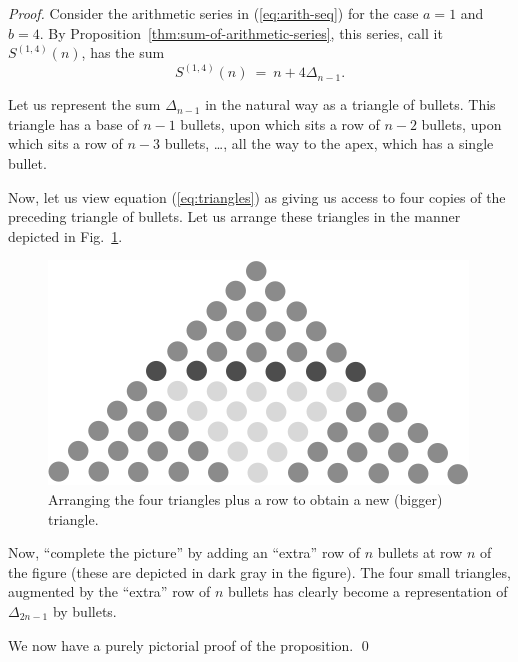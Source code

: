 \begin{proof} 
Consider the arithmetic series in (\ref{eq:arith-seq}) for the case
$a=1$ and $b=4$.  By Proposition~\ref{thm:sum-of-arithmetic-series},
this series, call it $S^{(1,4)}(n)$, has the sum
\begin{equation}
\label{eq:triangles}
S^{(1,4)}(n) \ = \ n + 4 \Delta_{n-1}.
\end{equation}

Let us represent the sum $\Delta_{n-1}$ in the natural way as a
triangle of bullets.  This triangle has a base of $n-1$ bullets, upon
which sits a row of $n-2$ bullets, upon which sits a row of $n-3$
bullets, \ldots, all the way to the apex, which has a single bullet.

Now, let us view equation (\ref{eq:triangles}) as giving us access to four
copies of the preceding triangle of bullets.  Let us arrange these
triangles in the manner depicted in Fig.~\ref{fig:Delta(n)4}.
\begin{figure}[ht]
\begin{center}
       \includegraphics[scale=0.5]{FiguresMaths/Delta4}
 \caption{Arranging the four triangles plus a row to obtain a new (bigger) triangle.}
       \label{fig:Delta(n)4}
\end{center}
\end{figure}
Now, ``complete the picture'' by adding an ``extra'' row of $n$
bullets at row $n$ of the figure (these are depicted in dark gray in
the figure).  The four small triangles, augmented by the ``extra'' row
of $n$ bullets has clearly become a representation  of $\Delta_{2n-1}$
by bullets.

We now have a purely pictorial proof of the proposition. \qed
\end{proof} 
\medskip

